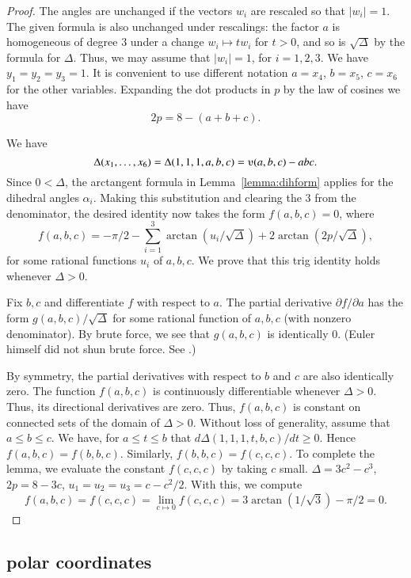 \begin{proof}
The angles are unchanged if the vectors $w_i$ are rescaled so that
$|w_i|=1$.  The given formula is also unchanged under rescalings:
the factor $a$ is homogeneous of degree $3$ under a change $w_i
\mapsto t w_i$ for $t>0$, and so is $\sqrt{\Delta}$ by the
formula for $\Delta$.  Thus, we may assume that $|w_i|=1$, for
$i=1,2,3$. We have $y_1=y_2=y_3=1$.  It is convenient to use
different notation $a=x_4$, $b=x_5$, $c=x_6$ for the other
variables. Expanding the dot products in $p$ by the law of cosines
we have
    $$2 p = 8 - (a+b+c).$$

We have $$\Delta(x_1,\ldots,x_6) = \Delta(1,1,1,a,b,c) =
    \ups(a,b,c) - a b c.$$
Since $0 <\Delta$, the arctangent formula
in Lemma~\ref{lemma:dihform} 
applies for the dihedral angles $\alpha_i$. Making
this substitution and clearing the $3$ from the denominator, the
desired identity now takes the form $f(a,b,c)=0$, where
    $$
    f(a,b,c)= -\pi/2 - \sum_{i=1}^3\arctan(u_i/\sqrt{\Delta}) +
    2\arctan(2 p/\sqrt{\Delta}),
    $$
for some rational functions $u_i$ of $a,b,c$.  We prove that this
trig identity holds whenever $\Delta>0$.

Fix $b,c$ and differentiate $f$ with respect
to $a$.  The partial derivative $\partial f/\partial a$ has the form
$g(a,b,c)/\sqrt{\Delta}$ for some rational function of $a,b,c$ (with
nonzero denominator).  By brute force, we see that $g(a,b,c)$ is
identically $0$.  (Euler himself did not shun brute force.  See
\cite{Euler}.)

By symmetry, the partial derivatives with respect to $b$ and $c$ are
also identically zero.  The function $f(a,b,c)$  is continuously
differentiable whenever $\Delta>0$.  Thus, its directional
derivatives are zero.  Thus, $f(a,b,c)$ is constant on connected
sets of the domain of $\Delta>0$.  Without loss of generality,
assume that $a\le b\le c$.  We have, for $a\le t\le b$ that
$d\Delta(1,1,1,t,b,c)/dt\ge 0$. Hence $f(a,b,c)=f(b,b,c)$. 
Similarly,
 $f(b,b,c)=f(c,c,c)$. 
To complete the lemma, we evaluate the constant $f(c,c,c)$
by taking $c$ small.
$\Delta=3c^2-c^3$, $2p= 8-3c$,  $u_1=u_2=u_3 = c -c^2/2$. With this,
we compute
    $$f(a,b,c)= f(c,c,c) = \lim_{c\mapsto0} f(c,c,c) = 
    3 \arctan(1/\sqrt3)-\pi/2 =0.$$
\end{proof}






\subsection{polar coordinates}
\label{sec:polar}

